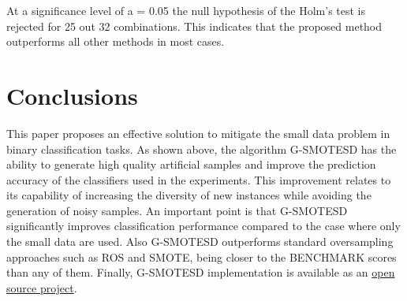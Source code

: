 \documentclass[parskip=full]{scrartcl}
\begin{document}
At a significance level of a = 0.05 the null hypothesis of the Holm's test is
rejected for 25 out 32 combinations. This indicates that the proposed method
outperforms all other methods in most cases.  

\section{Conclusions}
\label{conclusions}

This paper proposes an effective solution to mitigate the small data problem in binary classification tasks. As shown above, the algorithm G-SMOTESD has the ability to generate high quality artificial samples and improve the prediction accuracy of the classifiers used in the experiments. This improvement relates to its capability of increasing the diversity of new instances while avoiding the generation of noisy samples. An important point is that G-SMOTESD significantly improves classification performance compared to the case where only the small data are used. Also G-SMOTESD outperforms standard oversampling approaches such as ROS and SMOTE, being closer to the BENCHMARK scores than any of them. Finally, G-SMOTESD implementation is available as an \href{https://geometric-smote.readthedocs.io/en/latest/?badge=latest}{open source project}.



\end{document}
